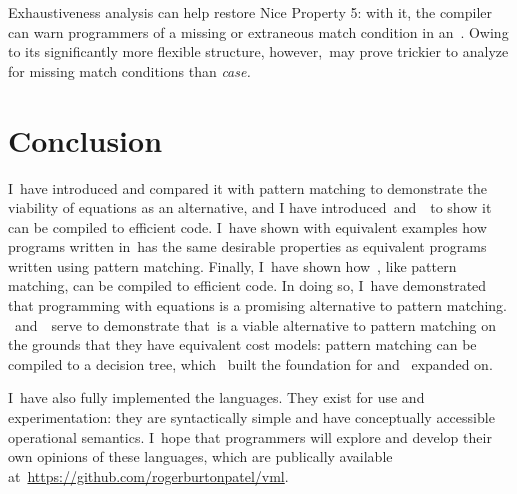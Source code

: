 \documentclass[manuscript,screen 12pt, nonacm]{acmart}
\begin{document}
    Exhaustiveness analysis can help restore Nice Property 5: with it, the
    compiler can warn programmers of a missing or extraneous match condition
    in an~\iffibf. Owing to its significantly more flexible structure,
    however,~\iffibf may prove trickier to analyze for missing match
    conditions than \it{case}.
    
    
    \section{Conclusion}

    I~have introduced \VMinus and compared it with pattern matching to
    demonstrate the viability of equations as an alternative, and I have
    introduced~\D and~\DTran\ to show it can be compiled to efficient code.
    I~have shown with equivalent examples how programs written in~\VMinus has
    the same desirable properties as equivalent programs written using pattern
    matching. Finally, I~have shown how~\VMinus, like pattern matching, can be
    compiled to efficient code. In doing so, I~have demonstrated that
    programming with equations is a promising alternative to pattern matching.
    \D~and~\DTran~serve to demonstrate that~\VMinus is a viable alternative to
    pattern matching on the grounds that they have equivalent cost models:
    pattern matching can be compiled to a decision tree,
    which~\citet{macqueen1985tree} built the foundation for and~\citet{maranget}
    expanded on.

    I~have also fully implemented the languages. They exist for use and
    experimentation: they are syntactically simple and have conceptually
    accessible operational semantics. I~hope that programmers will explore and
    develop their own opinions of these languages, which are publically
    available at~\url{https://github.com/rogerburtonpatel/vml}. 

    
    
\end{document}
